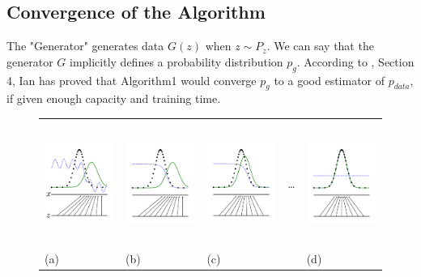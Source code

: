 \documentclass[12pt]{article}
\begin{document}
\subsection{Convergence of the Algorithm}
The "Generator" generates data $G(z)$ when $z \sim P_z$. We can say that the generator $G$ implicitly defines a probability distribution $p_g$. According to \cite{goodfellow2014generative}, Section 4, Ian has proved that Algorithm1 would converge $p_g$ to a good estimator of $p_{data}$, if given enough capacity and training time. 



\begin{figure}[h]
\begin{tabular}{m{3cm}m{3cm}m{3cm}m{0.1cm}m{3cm}}
    \includegraphics[width=3cm, height=4cm]{fig1.pdf} 
    &  
    \includegraphics[width=3cm, height=4cm]{fig2.pdf}
    & 
    \includegraphics[width=3cm, height=4cm]{fig3.pdf}
    &
    \dots
    &
    \includegraphics[width=3cm, height=4cm]{fig4.pdf}
    \\
    \centering (a)
    & 
    \centering (b) 
    & 
    \centering (c) 
    &  
    & 
    \centering (d)
\end{tabular}


\end{figure}
\end{document}
